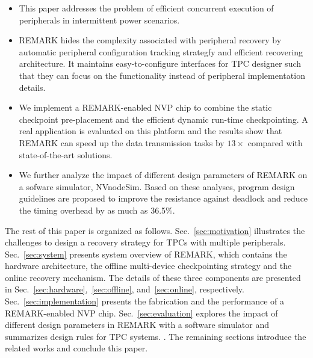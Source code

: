 %
\begin{itemize}
    \item This paper addresses the problem of efficient concurrent execution of peripherals in intermittent power scenarios.

    \item REMARK hides the complexity associated with peripheral recovery by automatic peripheral configuration tracking strategfy and efficient recovering architecture. It maintains easy-to-configure interfaces for TPC designer such that they can focus on the functionality instead of peripheral implementation details. 

    \item We implement a REMARK-enabled NVP chip to combine the static checkpoint pre-placement and the efficient dynamic run-time checkpointing. A real application is evaluated on this platform and the results show that REMARK can speed up the data transmission tasks by $13\times$ compared with state-of-the-art solutions. 

    \item We further analyze the impact of different design parameters of REMARK on a sofware simulator, NVnodeSim. Based on these analyses, program design guidelines are proposed to improve the resistance against deadlock and reduce the timing overhead by as much as 36.5\%.
\end{itemize}

The rest of this paper is organized as follows.
Sec.~\ref{sec:motivation} illustrates the challenges to design a recovery strategy for TPCs with multiple peripherals.
Sec.~\ref{sec:system} presents system overview of REMARK, which contains the hardware architecture, the offline multi-device checkpointing strategy and the online recovery mechanism.
The details of these three components are presented in Sec.~\ref{sec:hardware},~\ref{sec:offline}, and~\ref{sec:online}, respectively. 
Sec.~\ref{sec:implementation} presents the fabrication and the performance of a REMARK-enabled NVP chip.
Sec.~\ref{sec:evaluation} explores the impact of different design parameters in REMARK with a software simulator and summarizes design rules for TPC systems. .
The remaining sections introduce the related works and conclude this paper.
